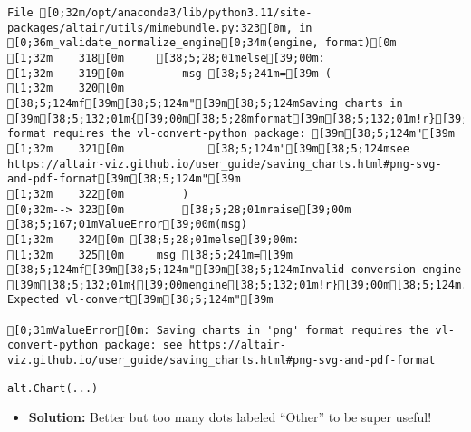 \documentclass[
  letterpaper,
  DIV=11,
  numbers=noendperiod]{scrartcl}
\providecommand{\tightlist}{%
  \setlength{\itemsep}{0pt}\setlength{\parskip}{0pt}}\usepackage{longtable,booktabs,array}
\begin{document}
\begin{verbatim}
File [0;32m/opt/anaconda3/lib/python3.11/site-packages/altair/utils/mimebundle.py:323[0m, in [0;36m_validate_normalize_engine[0;34m(engine, format)[0m
[1;32m    318[0m     [38;5;28;01melse[39;00m:
[1;32m    319[0m         msg [38;5;241m=[39m (
[1;32m    320[0m             [38;5;124mf[39m[38;5;124m"[39m[38;5;124mSaving charts in [39m[38;5;132;01m{[39;00m[38;5;28mformat[39m[38;5;132;01m!r}[39;00m[38;5;124m format requires the vl-convert-python package: [39m[38;5;124m"[39m
[1;32m    321[0m             [38;5;124m"[39m[38;5;124msee https://altair-viz.github.io/user_guide/saving_charts.html#png-svg-and-pdf-format[39m[38;5;124m"[39m
[1;32m    322[0m         )
[0;32m--> 323[0m         [38;5;28;01mraise[39;00m [38;5;167;01mValueError[39;00m(msg)
[1;32m    324[0m [38;5;28;01melse[39;00m:
[1;32m    325[0m     msg [38;5;241m=[39m [38;5;124mf[39m[38;5;124m"[39m[38;5;124mInvalid conversion engine [39m[38;5;132;01m{[39;00mengine[38;5;132;01m!r}[39;00m[38;5;124m. Expected vl-convert[39m[38;5;124m"[39m

[0;31mValueError[0m: Saving charts in 'png' format requires the vl-convert-python package: see https://altair-viz.github.io/user_guide/saving_charts.html#png-svg-and-pdf-format
\end{verbatim}

\begin{verbatim}
alt.Chart(...)
\end{verbatim}

\begin{itemize}
\tightlist
\item
  \textbf{Solution:} Better but too many dots labeled ``Other'' to be
  super useful!
\end{itemize}
\end{document}
